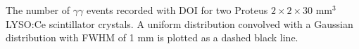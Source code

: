 \label{fig:confinement} The number of $\gamma\gamma$ events recorded with DOI for two Proteus $2\times2\times30$ mm$^3$ LYSO:Ce scintillator crystals. A uniform distribution convolved with a Gaussian distribution with FWHM of 1 mm is plotted as a dashed black line.